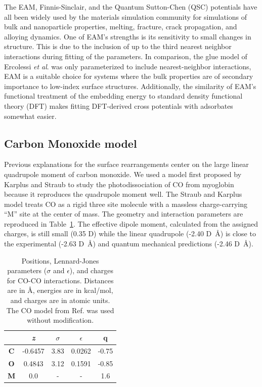 \documentclass[journal = jpccck, manuscript = article]{achemso}
\begin{document}
The EAM, Finnis-Sinclair, and the Quantum Sutton-Chen (QSC) potentials
have all been widely used by the materials simulation community for
simulations of bulk and nanoparticle
properties,\cite{Chui:2003fk,Wang:2005qy,Medasani:2007uq,mishin99:_inter}
melting,\cite{Belonoshko00,sankaranarayanan:155441,Sankaranarayanan:2005lr}
fracture,\cite{Shastry:1996qg,Shastry:1998dx,mishin01:cu} crack
propagation,\cite{BECQUART:1993rg,Rifkin1992} and alloying
dynamics.\cite{Shibata:2002hh,mishin02:b2nial,zope03:tial_ap,mishin05:phase_fe_ni}
One of EAM's strengths is its sensitivity to small changes in
structure. This is due to the inclusion of up to the third nearest
neighbor interactions during fitting of the parameters.\cite{Voter95a}
In comparison, the glue model of Ercolessi {\it et
  al}.\cite{Ercolessi88} was only parameterized to include
nearest-neighbor interactions, EAM is a suitable choice for systems
where the bulk properties are of secondary importance to low-index
surface structures. Additionally, the similarity of EAM's functional
treatment of the embedding energy to standard density functional
theory (DFT) makes fitting DFT-derived cross potentials with
adsorbates somewhat easier.

\subsection{Carbon Monoxide model}
Previous explanations for the surface rearrangements center on the
large linear quadrupole moment of carbon monoxide.\cite{Tao:2010} We
used a model first proposed by Karplus and Straub to study the
photodissociation of CO from myoglobin because it reproduces the
quadrupole moment well.\cite{Straub} The Straub and Karplus model
treats CO as a rigid three site molecule with a massless
charge-carrying ``M'' site at the center of mass. The geometry and
interaction parameters are reproduced in Table~\ref{tab:CO}. The
effective dipole moment, calculated from the assigned charges, is
still small (0.35 D) while the linear quadrupole (-2.40 D~\AA) is
close to the experimental (-2.63 D~\AA)\cite{QuadrupoleCO} and quantum
mechanical predictions (-2.46 D~\AA)\cite{QuadrupoleCOCalc}.
\begin{table}[H]
  \caption{Positions, Lennard-Jones parameters ($\sigma$ and
    $\epsilon$), and charges for CO-CO 
    interactions. Distances are in \AA, energies are 
    in kcal/mol, and charges are in atomic units.  The CO model
    from Ref.
    \protect\cite{Straub} was used without modification.}
\centering
\begin{tabular}{| c | c | ccc |}
\hline
&  {\it z} & $\sigma$ & $\epsilon$ & q\\
\hline
\textbf{C} & -0.6457 &  3.83 & 0.0262   &   -0.75 \\
\textbf{O} &  0.4843 &  3.12 &  0.1591  &   -0.85 \\
\textbf{M} & 0.0 & -  &  -  &    1.6 \\
\hline
\end{tabular}
\label{tab:CO}
\end{table}
\end{document}
